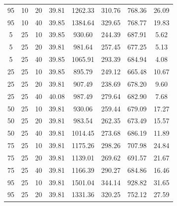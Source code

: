 \begin{table}[H]
\begin{tabular}{ccc|c|c|c|c|c}
95 & 10 & 20 & \cellcolor{gray!50}39.81 & \cellcolor{gray!1}1262.33 & \cellcolor{gray!1}310.76 & \cellcolor{gray!17}768.36 & 26.09\\
95 & 10 & 40 & \cellcolor{gray!50}39.85 & \cellcolor{gray!1}1384.64 & \cellcolor{gray!1}329.65 & \cellcolor{gray!17}768.77 & 19.83\\
5 & 25 & 10 & \cellcolor{gray!50}39.85 & \cellcolor{gray!16}930.60 & \cellcolor{gray!1}244.39 & \cellcolor{gray!42}687.91 & 5.62\\
5 & 25 & 20 & \cellcolor{gray!50}39.81 & \cellcolor{gray!8}981.64 & \cellcolor{gray!1}257.45 & \cellcolor{gray!45}677.25 & 5.13\\
5 & 25 & 40 & \cellcolor{gray!50}39.85 & \cellcolor{gray!1}1065.91 & \cellcolor{gray!1}293.39 & \cellcolor{gray!43}684.94 & 4.08\\
25 & 25 & 10 & \cellcolor{gray!50}39.85 & \cellcolor{gray!22}895.79 & \cellcolor{gray!1}249.12 & \cellcolor{gray!49}665.48 & 10.67\\
25 & 25 & 20 & \cellcolor{gray!50}39.81 & \cellcolor{gray!20}907.49 & \cellcolor{gray!1}238.69 & \cellcolor{gray!45}678.20 & 9.60\\
25 & 25 & 40 & \cellcolor{gray!48}40.08 & \cellcolor{gray!7}987.49 & \cellcolor{gray!1}279.64 & \cellcolor{gray!43}682.90 & 7.68\\
50 & 25 & 10 & \cellcolor{gray!50}39.81 & \cellcolor{gray!16}930.06 & \cellcolor{gray!1}259.44 & \cellcolor{gray!45}679.09 & 17.27\\
50 & 25 & 20 & \cellcolor{gray!50}39.81 & \cellcolor{gray!7}983.54 & \cellcolor{gray!1}262.35 & \cellcolor{gray!46}673.49 & 15.57\\
50 & 25 & 40 & \cellcolor{gray!50}39.81 & \cellcolor{gray!2}1014.45 & \cellcolor{gray!1}273.68 & \cellcolor{gray!42}686.19 & 11.89\\
75 & 25 & 10 & \cellcolor{gray!50}39.81 & \cellcolor{gray!1}1175.26 & \cellcolor{gray!1}298.26 & \cellcolor{gray!36}707.98 & 24.84\\
75 & 25 & 20 & \cellcolor{gray!50}39.81 & \cellcolor{gray!1}1139.01 & \cellcolor{gray!1}269.62 & \cellcolor{gray!41}691.57 & 21.67\\
75 & 25 & 40 & \cellcolor{gray!50}39.81 & \cellcolor{gray!1}1166.39 & \cellcolor{gray!1}290.27 & \cellcolor{gray!43}684.86 & 16.46\\
95 & 25 & 10 & \cellcolor{gray!50}39.81 & \cellcolor{gray!1}1501.04 & \cellcolor{gray!1}344.14 & \cellcolor{gray!1}928.82 & 31.65\\
95 & 25 & 20 & \cellcolor{gray!50}39.81 & \cellcolor{gray!1}1331.36 & \cellcolor{gray!1}320.25 & \cellcolor{gray!22}752.12 & 27.59\\

\end{tabular}
\end{table}
